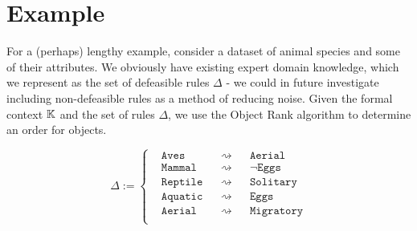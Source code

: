 \section{Example}
\label{section: example}
For a (perhaps) lengthy example, consider a dataset of animal species and some of their attributes. We obviously have existing expert domain knowledge, which we represent as the set of defeasible rules $\Delta$ - we could in future investigate including non-defeasible rules as a method of reducing noise. Given the formal context $\mathbb{K}$ and the set of rules $\Delta$, we use the Object Rank algorithm to determine an order for objects.

\begin{equation*}
    \Delta := \left\{
    \begin{aligned}
         & \texttt{Aves}    &  & \rightsquigarrow &  & \texttt{Aerial}    \\
         & \texttt{Mammal}  &  & \rightsquigarrow &  & \neg\texttt{Eggs}  \\
         & \texttt{Reptile} &  & \rightsquigarrow &  & \texttt{Solitary}  \\
         & \texttt{Aquatic} &  & \rightsquigarrow &  & \texttt{Eggs}      \\
         & \texttt{Aerial}  &  & \rightsquigarrow &  & \texttt{Migratory} \\
    \end{aligned}
    \right.
\end{equation*}

